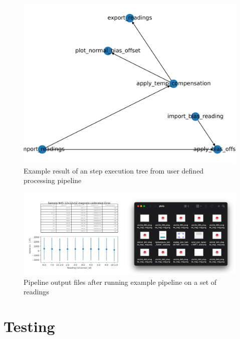 \begin{figure}
\centering
\includegraphics{./generated_images/border_Example_result_of_an_step_execution_tree_from_user_defined_processing_pipeline.png}
\caption{Example result of an step execution tree from user defined
processing pipeline
\label{Example_result_of_an_step_execution_tree_from_user_defined_processing_pipeline.png}}
\end{figure}

\begin{figure}
\centering
\includegraphics{./generated_images/border_Pipeline_output_files_after_running_example_pipeline_on_a_set_of_readings.png}
\caption{Pipeline output files after running example pipeline on a set
of readings
\label{Pipeline_output_files_after_running_example_pipeline_on_a_set_of_readings.png}}
\end{figure}

\hypertarget{testing}{%
\section{Testing}\label{testing}}

